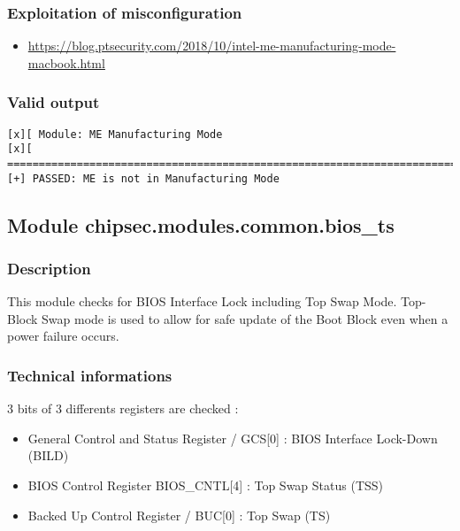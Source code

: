 \hypertarget{exploitation-of-misconfiguration}{%
\subsubsection{Exploitation of
misconfiguration}\label{exploitation-of-misconfiguration}}

\begin{itemize}
\tightlist
\item
  \url{https://blog.ptsecurity.com/2018/10/intel-me-manufacturing-mode-macbook.html}
\end{itemize}

\hypertarget{valid-output-4}{%
\subsubsection{Valid output}\label{valid-output-4}}

\begin{verbatim}
[x][ Module: ME Manufacturing Mode
[x][ =======================================================================
[+] PASSED: ME is not in Manufacturing Mode
\end{verbatim}

\hypertarget{module-chipsec.modules.common.bios_ts}{%
\subsection{Module
chipsec.modules.common.bios\_ts}\label{module-chipsec.modules.common.bios_ts}}

\hypertarget{description-5}{%
\subsubsection{Description}\label{description-5}}

This module checks for BIOS Interface Lock including Top Swap Mode.
Top-Block Swap mode is used to allow for safe update of the Boot Block
even when a power failure occurs.

\hypertarget{technical-informations-5}{%
\subsubsection{Technical informations}\label{technical-informations-5}}

3 bits of 3 differents registers are checked :

\begin{itemize}
\tightlist
\item
  General Control and Status Register / GCS{[}0{]} : BIOS Interface
  Lock-Down (BILD)
\item
  BIOS Control Register BIOS\_CNTL{[}4{]} : Top Swap Status (TSS)
\item
  Backed Up Control Register / BUC{[}0{]} : Top Swap (TS)
\end{itemize}

